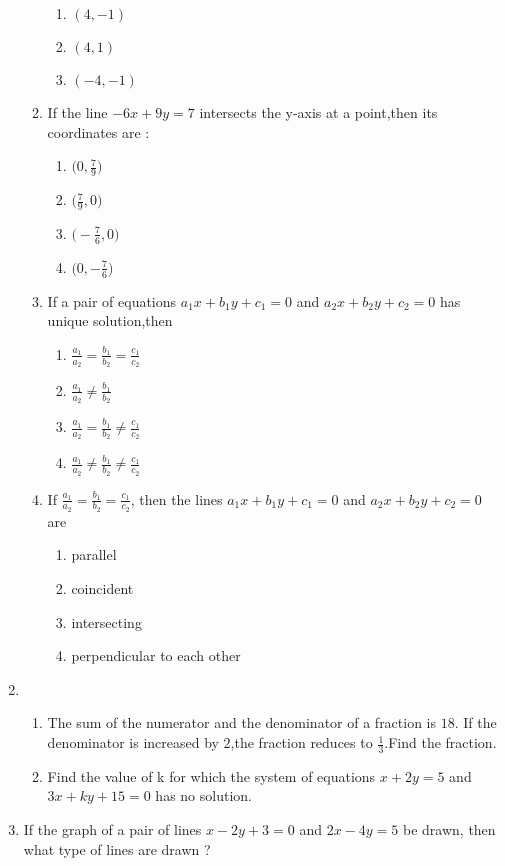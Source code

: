 \begin{enumerate}
\begin{enumerate}[label=(\roman*)]
\begin{enumerate}[label=(\Alph*)]
             \item $\left( 4,-1 \right)$
             \item $\left( 4,1 \right)$
             \item $\left( -4,-1 \right)$
    \end{enumerate}
\item If the line $-6x+9y=7$ intersects the y-axis at a point,then its coordinates are :
\begin{enumerate}[label=(\Alph*)]
             \item $\bigg(0,\frac{7}{9}\bigg)$
             \item $\bigg(\frac{7}{9},0\bigg)$
             \item $\bigg(-\frac{7}{6},0\bigg)$
             \item $\bigg(0,-\frac{7}{6}\bigg)$
\end{enumerate}
\item If a pair of equations $a_1x+b_1y+c_1=0$ and  $a_2x+b_2y+c_2=0$ has unique solution,then
\begin{enumerate}[label=(\Alph*)]
             \item $\frac{a_1}{a_2}=\frac{b_1}{b_2}=\frac{c_1}{c_2}$
             \item  $\frac{a_1}{a_2}\neq\frac{b_1}{b_2}$
             \item $\frac{a_1}{a_2}=\frac{b_1}{b_2}\neq\frac{c_1}{c_2}$
             \item $\frac{a_1}{a_2}\neq\frac{b_1}{b_2}\neq\frac{c_1}{c_2}$
\end{enumerate}
\item If $\frac{a_1}{a_2}=\frac{b_1}{b_2}=\frac{c_1}{c_2}$, then the lines $a_1x+b_1y+c_1=0$ and  $a_2x+b_2y+c_2=0$ are
\begin{enumerate}[label=(\Alph*)]
             \item parallel
             \item coincident
             \item intersecting
             \item perpendicular to each other
\end{enumerate}
\end{enumerate}
\item
\begin{enumerate}
\item The sum of the numerator and the denominator of a fraction is $18$. If the denominator is increased by $2$,the fraction reduces to $\frac{1}{3}$.Find the fraction.
\item Find the value of k for which the system of equations $x+2y=5$ and $3x+ky+15=0$ has no solution.
\end{enumerate}
\item If the graph of a pair of lines $x-2y+3=0$ and $2x-4y=5$ be drawn, then what type of lines are drawn ?
\end{enumerate}
